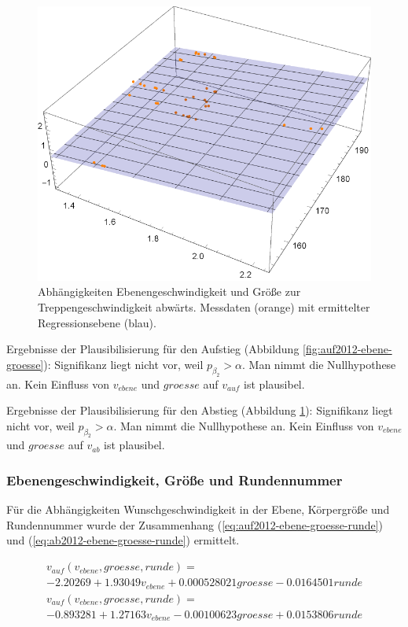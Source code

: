 \begin{figure} \centering 
	\includegraphics[]{abbildungen/regression/2012/ab-ebene-groesse.pdf}
	
	\caption{Abhängigkeiten Ebenengeschwindigkeit und Größe zur Treppengeschwindigkeit abwärts. Messdaten (orange) mit ermittelter Regressionsebene (blau). \label{fig:ab2012-ebene-groesse}}
\end{figure}

Ergebnisse der Plausibilisierung für den Aufstieg
(Abbildung \ref{fig:auf2012-ebene-groesse}):
Signifikanz liegt nicht vor, weil $p_{\beta_2} > \alpha$. Man nimmt die
Nullhypothese an. Kein Einfluss von $v_{ebene}$ und $groesse$ auf $v_{auf}$ ist plausibel.

Ergebnisse der Plausibilisierung für den Abstieg
(Abbildung \ref{fig:ab2012-ebene-groesse}):
Signifikanz liegt nicht vor, weil $p_{\beta_2} > \alpha$. Man nimmt die
Nullhypothese an. Kein Einfluss von $v_{ebene}$ und $groesse$ auf $v_{ab}$ ist plausibel.


\subsubsection{Ebenengeschwindigkeit, Größe und Rundennummer}

Für die Abhängigkeiten Wunschgeschwindigkeit in der Ebene, Körpergröße und Rundennummer wurde 
der Zusammenhang (\ref{eq:auf2012-ebene-groesse-runde}) und (\ref{eq:ab2012-ebene-groesse-runde}) ermittelt.

\begin{multline} \label{eq:auf2012-ebene-groesse-runde}
v_{auf}(v_{ebene}, groesse, runde) = \\
-2.20269 + 1.93049 v_{ebene} + 0.000528021 groesse - 0.0164501  runde
\end{multline}
\begin{multline} \label{eq:ab2012-ebene-groesse-runde}
v_{auf}(v_{ebene}, groesse, runde) = \\
- 0.893281 + 1.27163 v_{ebene} - 0.00100623 groesse + 0.0153806  runde
\end{multline}

